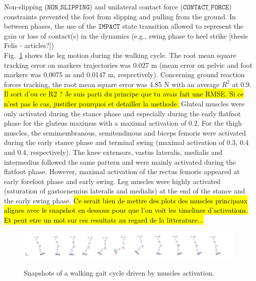 Non-slipping ($\mathtt{NON\_SLIPPING}$) and unilateral contact force ($\mathtt{CONTACT\_FORCE}$) constraints prevented the foot from slipping and pulling from the ground. 
In between phases, the use of the $\mathtt{IMPACT}$ state transition allowed to represent the gain or loss of contact(s) in the dynamics (e.g., swing phase to heel strike [thesis Felis - articles?]) \\

Fig.~\ref{fig:snapshots_multiphase_walking_cycle} shows the leg motion during the walking cycle. 
The root mean square tracking error on markers trajectories was 0.027 m (mean error on pelvic and foot markers was 0.0075 m and 0.0147 m, respectively). 
Concerning ground reaction forces tracking, the root mean square error was 4.85 N with an average $R^2$ at 0.9.
\hl{Il sort d'ou ce R2 ? Je suis parti du principe que tu avais fait une RMSE. Si ce n'est pas le cas, justifier pourquoi et detailler la methode.} 
Gluteal muscles were only activated during the stance phase and especially during the early flatfoot phase for the gluteus maximus with a maximal activation of 0.2. 
For the thigh muscles, the semimembranous, semitendinous and biceps femoris were activated during the early stance phase and terminal swing (maximal activation of 0.3, 0.4 and 0.4, respectively). 
The knee extensors, vastus lateralis, medialis and intermedius followed the same pattern and were mainly activated during the flatfoot phase. 
However, maximal activation of the rectus femoris appeared at early forefoot phase and early swing. 
Leg muscles were highly activated (saturation of gastocnemius lateralis and medialis) at the end of the stance and the early swing phase. 
\hl{Ce serait bien de mettre des plots des muscles principaux alignes avec le snapshot en dessous pour que l'on voit les timelines d'activations. Et peut etre un mot sur ces resultats au regard de la litterature...} 
\begin{figure}[t!]
\centering
\includegraphics[width=\textwidth]{figures/multiphase_walking_cycle.png}\\
\caption{Snapshots of a walking gait cycle driven by muscles activation.}
\label{fig:snapshots_multiphase_walking_cycle}
\end{figure}
